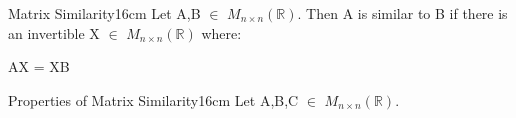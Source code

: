     \vspace{0.5cm}



    \begin{definition}{Matrix Similarity}{16cm}
        Let A,B $\in$ $M_{n \times n}(\mathbb{R})$.
        Then A is {\color{lblue} similar} to B if there is an invertible
        X $\in$ $M_{n \times n}(\mathbb{R})$ where:

        \hspace{0.5cm}
        AX = XB
    \end{definition}

    \newpage



    \begin{wtheorem}{Properties of Matrix Similarity}{16cm}
        Let A,B,C $\in$ $M_{n \times n}(\mathbb{R})$.
    \end{wtheorem}

